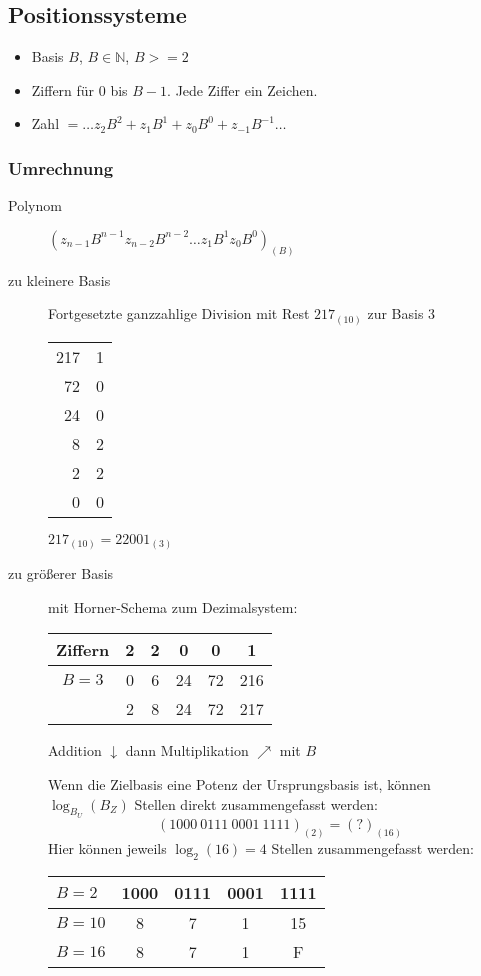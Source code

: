 \subsection{Positionssysteme}
\begin{itemize}
    \item Basis $B$, $B \in \mathbb{N}$, $B>=2$
    \item Ziffern für $0$ bis $B-1$. Jede Ziffer ein Zeichen.
    \item Zahl $= \dots z_2B^2+z_1B^1+z_0B^0+z_{-1}B^{-1} \dots$
\end{itemize}
\subsubsection{Umrechnung}
\begin{description}
    \item[Polynom] $(z_{n-1}B^{n-1}z_{n-2}B^{n-2} \dots z_1B^{1}z_0B^{0})_{(B)}$
    \item[zu kleinere Basis] Fortgesetzte ganzzahlige Division mit Rest
    $217_{(10)}$ zur Basis 3 \\
    \begin{tabular}{r c}
        217 & 1 \\
        72  & 0 \\
        24  & 0 \\
        8   & 2 \\
        2   & 2 \\
        0   & 0
    \end{tabular} $217_{(10)} = 22001_{(3)}$
    \item[zu größerer Basis] mit Horner-Schema zum Dezimalsystem:

    \begin{tabular}{|c||c|c|c|c|c|} \hline
    Ziffern & 2 & 2 & 0  & 0  & 1   \\ \hline \hline
    $B=3$   & 0 & 6 & 24 & 72 & 216 \\ \hline
    & 2 & 8 & 24 & 72 & 217 \\ \hline
    \end{tabular} Addition $\downarrow$ dann Multiplikation $\nearrow$ mit $B$

    Wenn die Zielbasis eine Potenz der Ursprungsbasis ist, können $\log_{B_U}(B_Z)$ Stellen direkt zusammengefasst werden:
    $$(1000\ 0111\ 0001\ 1111)_{(2)}=(?)_{(16)}$$
    Hier können jeweils $\log_2(16)=4$ Stellen zusammengefasst werden:

    \begin{tabular}[t]{|l||c|c|c|c|} \hline
    $B = 2$  & 1000 & 0111 & 0001 & 1111 \\ \hline
    $B = 10$ & 8    & 7    & 1    & 15   \\ \hline
    $B = 16$ & 8    & 7    & 1    & F    \\ \hline
    \end{tabular}
\end{description}
